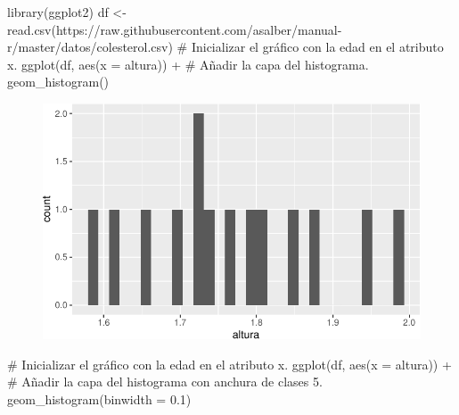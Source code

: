 \documentclass[
  a4paper,
]{scrreport}
\newenvironment{Shaded}{\begin{snugshade}}{\end{snugshade}}
\newcommand{\AttributeTok}[1]{\textcolor[rgb]{0.40,0.45,0.13}{#1}}
\newcommand{\CommentTok}[1]{\textcolor[rgb]{0.37,0.37,0.37}{#1}}
\newcommand{\FloatTok}[1]{\textcolor[rgb]{0.68,0.00,0.00}{#1}}
\newcommand{\FunctionTok}[1]{\textcolor[rgb]{0.28,0.35,0.67}{#1}}
\newcommand{\NormalTok}[1]{\textcolor[rgb]{0.00,0.23,0.31}{#1}}
\newcommand{\OtherTok}[1]{\textcolor[rgb]{0.00,0.23,0.31}{#1}}
\newcommand{\SpecialCharTok}[1]{\textcolor[rgb]{0.37,0.37,0.37}{#1}}
\newcommand{\StringTok}[1]{\textcolor[rgb]{0.13,0.47,0.30}{#1}}
\theoremstyle{definition}
\theoremstyle{definition}
\theoremstyle{remark}
\begin{document}
\begin{Shaded}
\begin{Highlighting}[]
\FunctionTok{library}\NormalTok{(ggplot2)}
\NormalTok{df }\OtherTok{\textless{}{-}} \FunctionTok{read.csv}\NormalTok{(}\StringTok{\textquotesingle{}https://raw.githubusercontent.com/asalber/manual{-}r/master/datos/colesterol.csv\textquotesingle{}}\NormalTok{)}
\CommentTok{\# Inicializar el gráfico con la edad en el atributo x.}
\FunctionTok{ggplot}\NormalTok{(df, }\FunctionTok{aes}\NormalTok{(}\AttributeTok{x =}\NormalTok{ altura)) }\SpecialCharTok{+}
\CommentTok{\# Añadir la capa del histograma.}
    \FunctionTok{geom\_histogram}\NormalTok{()}
\end{Highlighting}
\end{Shaded}

\begin{figure}[H]

{\centering \includegraphics{./07-graficos_files/figure-pdf/unnamed-chunk-15-1.pdf}

}

\end{figure}

\begin{Shaded}
\begin{Highlighting}[]
\CommentTok{\# Inicializar el gráfico con la edad en el atributo x.}
\FunctionTok{ggplot}\NormalTok{(df, }\FunctionTok{aes}\NormalTok{(}\AttributeTok{x =}\NormalTok{ altura)) }\SpecialCharTok{+}
\CommentTok{\# Añadir la capa del histograma con anchura de clases 5.}
    \FunctionTok{geom\_histogram}\NormalTok{(}\AttributeTok{binwidth =} \FloatTok{0.1}\NormalTok{)}
\end{Highlighting}
\end{Shaded}
\end{document}
